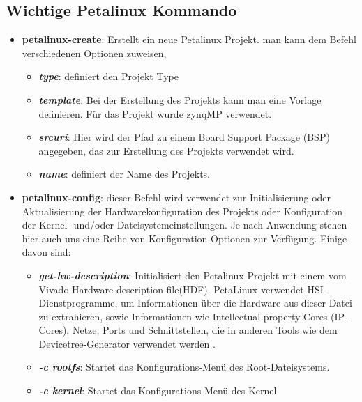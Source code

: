 \subsection{Wichtige Petalinux Kommando}
\begin{itemize}
	\item \textbf{petalinux-create}: Erstellt ein neue Petalinux Projekt. man kann dem Befehl verschiedenen Optionen zuweisen, 
	\begin{itemize}
		\item \textbf{\emph{type}}: definiert den Projekt Type
		
		\item \textbf{\emph{template}}: Bei der Erstellung des Projekts kann man eine Vorlage definieren. Für das Projekt wurde zynqMP verwendet.
		
		\item \textbf{\emph{srcuri}}: Hier wird der Pfad zu einem Board Support Package (BSP) angegeben, das zur Erstellung des Projekts verwendet wird. 
		
		\item \textbf{\emph{name}}: definiert der Name des Projekts. 
	\end{itemize}
	
	\item \textbf{petalinux-config}: dieser Befehl wird verwendet zur Initialisierung oder Aktualisierung der Hardwarekonfiguration des Projekts oder Konfiguration der Kernel- und/oder Dateisystemeinstellungen. Je nach Anwendung stehen hier auch uns eine Reihe von Konfiguration-Optionen zur Verfügung. Einige davon sind:
	\begin{itemize}
		\item \textbf{\emph{get-hw-description}}: Initialisiert den Petalinux-Projekt mit einem vom Vivado Hardware-description-file(HDF). PetaLinux verwendet HSI-Dienstprogramme, um Informationen über die Hardware aus dieser Datei zu extrahieren, sowie Informationen wie Intellectual property Cores (IP-Cores), Netze, Ports und Schnittstellen, die in anderen Tools wie dem Devicetree-Generator verwendet werden .
		
		\item \textbf{\emph{-c rootfs}}: Startet das Konfigurations-Menü des Root-Dateisystems.
		
		\item \textbf{\emph{-c kernel}}: Startet das Konfigurations-Menü des Kernel. 
	\end{itemize}
	

\end{itemize}
